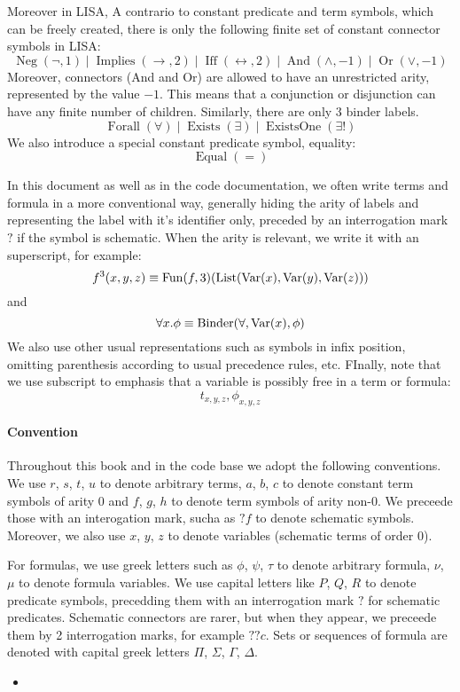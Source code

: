 \begin{defin}[Formulas]
$$$$
Moreover in LISA, A contrario to constant predicate and term symbols, which can be freely created, there is only the following finite set of constant connector symbols in LISA:
$$
\operatorname{Neg}(\neg, 1)\mid \operatorname{Implies}(\rightarrow, 2)\mid \operatorname{Iff}(\leftrightarrow, 2)\mid \operatorname{And}(\land, -1)\mid \operatorname{Or}(\lor, -1)
$$
Moreover, connectors (And and Or) are allowed to have an unrestricted arity, represented by the value $-1$. This means that a conjunction or disjunction can have any finite number of children. 
Similarly, there are only 3 binder labels.
$$
\operatorname{Forall}(\forall)\mid \operatorname{Exists}(\exists)\mid \operatorname{ExistsOne}(\exists !)
$$
We also introduce a special constant predicate symbol, equality:
$$
\operatorname{Equal}(=)
$$
\end{defin}

In this document as well as in the code documentation, we often write terms and formula in a more conventional way, generally hiding the arity of labels and representing the label with it's identifier only, preceded by an interrogation mark $?$ if the symbol is schematic. When the arity is relevant, we write it with an superscript, for example:
$$
f^3(x,y,z) \equiv \operatorname{Fun}(f, 3)(\operatorname{List}(\operatorname{Var}(x), \operatorname{Var}(y), \operatorname{Var}(z)))
$$
and
$$
\forall x. \phi \equiv \operatorname{Binder}(\forall, \operatorname{Var}(x), \phi)
$$
We also use other usual representations such as symbols in infix position, omitting parenthesis according to usual precedence rules, etc.
FInally, note that we use subscript to emphasis that a variable is possibly free in a term or formula:
$$
t_{x,y,z}, \phi_{x,y,z}
$$

\paragraph{Convention} Throughout this book and in the code base we adopt the following conventions. We use $r$, $s$, $t$, $u$ to denote arbitrary terms, $a$, $b$, $c$ to denote constant term symbols of arity $0$ and $f$, $g$, $h$ to denote term symbols of arity non-$0$. We preceede those with an interogation mark, sucha as $?f$ to denote schematic symbols. Moreover, we also use $x$, $y$, $z$ to denote variables (schematic terms of order $0$).

For formulas, we use greek letters such as $\phi$, $\psi$, $\tau$ to denote arbitrary formula, $\nu$, $\mu$ to denote formula variables. We use capital letters like $P$, $Q$, $R$ to denote predicate symbols, precedding them with an interrogation mark $?$ for schematic predicates. Schematic connectors are rarer, but when they appear, we preceede them by 2 interrogation marks, for example $??c$. Sets or sequences of formula are denoted with capital greek letters $\Pi$, $\Sigma$, $\Gamma$, $\Delta$.
\begin{itemize}
\item 
\end{itemize}

